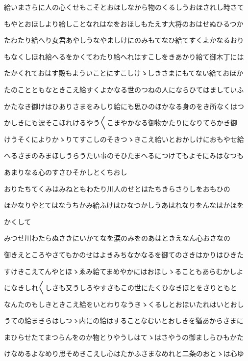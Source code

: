 \documentclass[a4paper,11pt,landscape]{ltjtarticle}
\begin{document}
給いまさらに人の心くせもこそとおほしなから物のくるしうおほされし時さて
\par\medskip
もやとおほしより給しことなれはなをおほしもたえす大将のおはせぬひるつか
\par\medskip
たわたり給へり女君あやしうなやましけにのみもてなひ給てすくよかなるおり
\par\medskip
もなくしほれ給へるをかくてわたり給へれはすこしをきあかり給て御木丁には
\par\medskip
たかくれておはす殿もよういことにすこしけゝしきさまにもてない給ておほか
\par\medskip
たのことともなときこえ給すくよかなる世のつねの人にならひてはましていふ
\par\medskip
かたなき御けはひありさまをみしり給にも思ひのほかなる身のをき所なくはつ
\par\medskip
かしきにも涙そこほれけるやう〱こまやかなる御物かたりになりてちかき御
\par\medskip
けうそくによりかゝりてすこしのそきつゝきこえ給いとおかしけにおもやせ給
\par\medskip
へるさまのみまほしうらうたい事のそひたまへるにつけてもよそにみはなつも
\par\medskip
あまりなる心のすさひそかしとくちおし
\par\medskip
おりたちてくみはみねともわたり川人のせとはたちきらさりしをおもひの
\par\medskip
ほかなりやとてはなうちかみ給ふけはひなつかしうあはれなりをんなはかほを
\par\medskip
かくして
\par\medskip
みつせ川わたらぬさきにいかてなを涙のみをのあはときえなん心おさなの
\par\medskip
御きえところやさてもかのせはよきみちなかなるを御てのさきはかりはひきた
\par\medskip
すけきこえてんやとほゝゑみ給てまめやかにはおほしゝることもあらむかしよ
\par\medskip
になきしれ〱しさも又うしろやすさもこの世にたくひなきほとをさりともと
\par\medskip
なんたのもしきときこえ給をいとわりなうきゝくるしとおほいたれはいとおし
\par\medskip
うての給まきらはしつゝ内にの給はすることなむいとおしきを猶あからさまに
\par\medskip
まひらせたてまつらんをのか物とりやうしはてゝはさやうの御ましらひもかた
\par\medskip
けなめるよなめり思そめきこえし心はたかふさまなめれと二条のおとゝは心ゆ
\par\medskip
\end{document}
